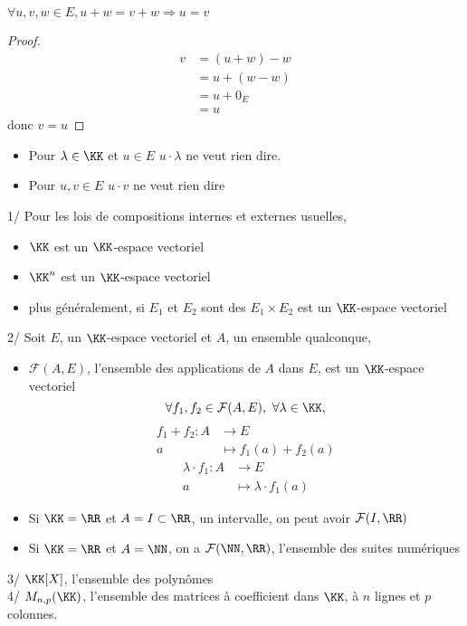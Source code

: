 \documentclass[../main.tex]{subfile}
\begin{document}
\begin{lemme}
	$\forall u, v, w \in E, u + w = v + w \Rightarrow u = v$
\end{lemme}

\begin{proof}
	$$
\begin{aligned}
	v &= (u + w) - w\\
	&= u + (w - w)\\
	&= u + 0_E\\
	&= u
\end{aligned}
	$$
	donc $v = u$
\end{proof}

\begin{rema}
\begin{itemize}
	\item Pour $\lambda \in \KK$ et $u \in E$
	$u \cdot \lambda$ ne veut rien dire.

	\item Pour $u, v \in E$
	$u \cdot v$ ne veut rien dire
\end{itemize}
\end{rema}

\begin{ex}
	1/ Pour les lois de compositions internes et externes usuelles, 
\begin{itemize}
	\item $\KK$ est un $\KK$-espace vectoriel
	\item $\KK^n$ est un $\KK$-espace vectoriel 
	\item plus généralement, si $E_1$ et $E_2$ sont des $E_1 \times E_2$ est un $\KK$-espace vectoriel
\end{itemize}
	2/ Soit $E$, un $\KK$-espace vectoriel et $A$, un ensemble qualconque, 
\begin{itemize}
	\item $\mathcal{F}(A, E)$, l'ensemble des applications de $A$ dans $E$, est un $\KK$-espace vectoriel
		$$
		\forall f_1, f_2 \in \mathcal{F}(A, E), \ \forall \lambda \in \KK,
		$$
		$$
		\begin{aligned}
			f_1 + f_2 : A &\to E\\
			a &\mapsto f_1(a) + f_2(a)
		\end{aligned}
		$$
		$$
		\begin{aligned}
			\lambda \cdot f_1 : A &\to E\\
			a &\mapsto \lambda \cdot f_1(a) 
		\end{aligned}
		$$
	\item Si $\KK = \RR$ et $A = I \subset \RR$, un intervalle, on peut avoir $\mathcal{F}(I, \RR)$
	\item Si $\KK = \RR$ et $A = \NN$, on a $\mathcal{F}(\NN, \RR)$, l'ensemble des suites numériques
\end{itemize}
	3/ $\KK[X]$, l'ensemble des polynômes\\
	4/ $M_{n,p}(\KK)$, l'ensemble des matrices à coefficient dans $\KK$, à $n$ lignes et $p$ colonnes.
\end{ex}
\end{document}
